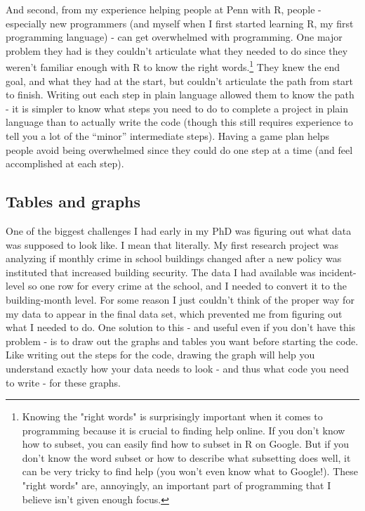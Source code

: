 \documentclass[
]{krantz}
\begin{document}
And second, from my experience helping people at Penn with
R, people - especially new programmers (and myself when I
first started learning R, my first programming language) -
can get overwhelmed with programming. One major problem they
had is they couldn't articulate what they needed to do since
they weren't familiar enough with R to know the right
words.\footnote{Knowing the "right words" is surprisingly important when it comes to programming because it is crucial to finding help online. If you don't know how to subset, you can easily find how to subset in R on Google. But if you don't know the word subset or how to describe what subsetting does well, it can be very tricky to find help (you won't even know what to Google!). These "right words" are, annoyingly, an important part of programming that I believe isn't given enough focus.}
They knew the end goal, and what they had at the start, but
couldn't articulate the path from start to finish. Writing
out each step in plain language allowed them to know the
path - it is simpler to know what steps you need to do to
complete a project in plain language than to actually write
the code (though this still requires experience to tell you
a lot of the ``minor'' intermediate steps). Having a game
plan helps people avoid being overwhelmed since they could
do one step at a time (and feel accomplished at each step).

\hypertarget{tables-and-graphs}{%
\subsection{Tables and graphs}\label{tables-and-graphs}}

One of the biggest challenges I had early in my PhD was
figuring out what data was supposed to look like. I mean
that literally. My first research project was analyzing if
monthly crime in school buildings changed after a new policy
was instituted that increased building security. The data I
had available was incident-level so one row for every crime
at the school, and I needed to convert it to the
building-month level. For some reason I just couldn't think
of the proper way for my data to appear in the final data
set, which prevented me from figuring out what I needed to
do. One solution to this - and useful even if you don't have
this problem - is to draw out the graphs and tables you want
before starting the code. Like writing out the steps for the
code, drawing the graph will help you understand exactly how
your data needs to look - and thus what code you need to
write - for these graphs.
\end{document}
